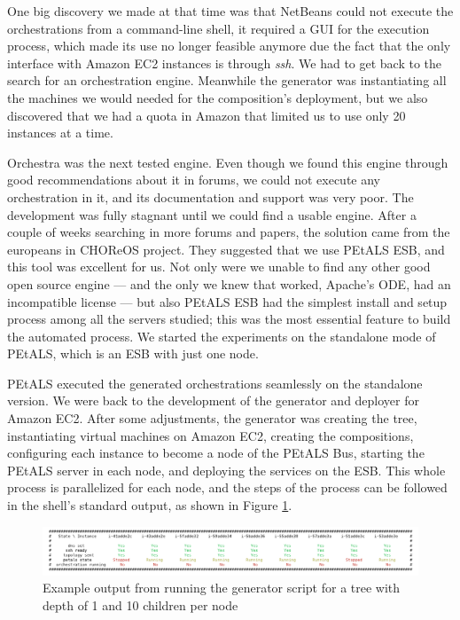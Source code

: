 One big discovery we made at that time was that NetBeans could not execute the orchestrations from a command-line shell, it required a GUI for the execution process, which made its use no longer feasible anymore due the fact that the only interface with Amazon EC2 instances is through \emph{ssh}. We had to get back to the search for an orchestration engine. Meanwhile the generator was instantiating all the machines we would needed for the composition's deployment, but we also discovered that we had a quota in Amazon that limited us to use only 20 instances at a time.

Orchestra was the next tested engine. Even though we found this engine through good recommendations about it in forums, we could not execute any orchestration in it, and its documentation and support was very poor. The development was fully stagnant until we could find a usable engine. After a couple of weeks searching in more forums and papers, the solution came from the europeans in CHOReOS project. They suggested that we use PEtALS ESB, and this tool was excellent for us. Not only were we unable to find any other good open source engine --- and the only we knew that worked, Apache's ODE, had an incompatible license --- but also PEtALS ESB had the simplest install and setup process among all the servers studied; this was the most essential feature to build the automated process. We started the experiments on the standalone mode of PEtALS, which is an ESB with just one node.

PEtALS executed the generated orchestrations seamlessly on the standalone version. We were back to the development of the generator and deployer for Amazon EC2. After some adjustments, the generator was creating the tree, instantiating virtual machines on Amazon EC2, creating the compositions, configuring each instance to become a node of the PEtALS Bus, starting the PEtALS server in each node, and deploying the services on the ESB. This whole process is parallelized for each node, and the steps of the process can be followed in the shell's standard output, as shown in Figure \ref{generation-output}.

\begin{figure}[htb]
	\centering
	\includegraphics[trim= 10mm 0mm 10mm 0mm, clip, width=\textwidth]{images/generation-output}
	\caption{Example output from running the generator script for a tree with depth of 1 and 10 children per node}
	\label{generation-output}
\end{figure}

